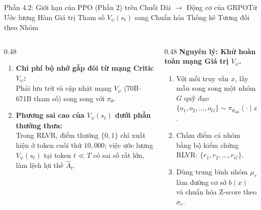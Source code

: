 \begin{frame}{Phần 4.2: Giới hạn của PPO (Phần 2) trên Chuỗi Dài $\longrightarrow$ Động cơ của GRPO}{Từ Ước lượng Hàm Giá trị Tham số $V_\psi(s_t)$ sang Chuẩn hóa Thống kê Tương đối theo Nhóm}
  \begin{columns}[T,onlytextwidth]
    \begin{column}{0.48\textwidth}
      \footnotesize
      \begin{enumerate}\setlength{\itemsep}{6pt}
        \item \textbf{Chi phí bộ nhớ gấp đôi từ mạng Critic $V_\psi$:}\\
          Phải lưu trữ và cập nhật mạng $V_\psi$ (70B--671B tham số) song song với $\pi_\theta$.
        \item \textbf{Phương sai cao của $V_\psi(s_t)$ dưới phần thưởng thưa:}\\
          Trong RLVR, điểm thưởng $\{0, 1\}$ chỉ xuất hiện ở token cuối thứ $10{,}000$; việc ước lượng $V_\psi(s_t)$ tại token $t \ll T$ có sai số rất lớn, làm lệch lợi thế $\hat{A}_t$.
      \end{enumerate}
    \end{column}
    \begin{column}{0.48\textwidth}
      \footnotesize
      \textbf{Nguyên lý: Khử hoàn toàn mạng Giá trị $V_\psi$.}
      \vspace{0.04cm}
      \begin{enumerate}\setlength{\itemsep}{4pt}
        \item Với mỗi truy vấn $x$, lấy mẫu song song một nhóm $G$ quỹ đạo $\{o_1, o_2, \dots, o_G\} \sim \pi_{\theta_{\text{old}}}(\cdot \mid x)$.
        \item Chấm điểm cả nhóm bằng bộ kiểm chứng RLVR: $\{r_1, r_2, \dots, r_G\}$.
        \item Dùng trung bình nhóm $\mu_r$ làm đường cơ sở $b(x)$ và chuẩn hóa Z-score theo $\sigma_r$.
      \end{enumerate}
    \end{column}
  \end{columns}
\end{frame}

